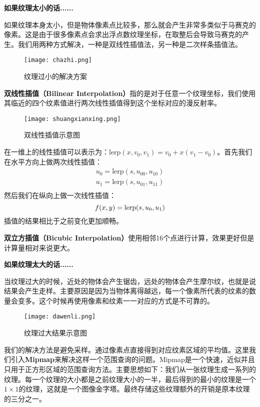 \documentclass[openany]{progbookcn}
\begin{document}
\textbf{如果纹理太小的话......}

如果纹理本身太小，但是物体像素点比较多，那么就会产生非常多类似于马赛克的像素。这是由于很多像素点会求出浮点数纹理坐标，在取整后会导致马赛克的产生。我们用两种方式解决，一种是双线性插值法，另一种是二次样条插值法。
\begin{figure}[H]
	\centering
	\texttt{[image: chazhi.png]}
	\caption{纹理过小的解决方案}
	\label{fig:chazhi}
\end{figure}

\textbf{双线性插值（Bilinear Interpolation）}指的是对于任意一个纹理坐标，我们使用其临近的四个纹素值进行两次线性插值得到这个坐标对应的漫反射率。

\begin{figure}[H]
	\centering
	\texttt{[image: shuangxianxing.png]}
	\caption{双线性插值示意图}
	\label{fig:shuangxianxing}
\end{figure}
在一维上的线性插值可以表示为：$\text{lerp}(x,v_0,v_1)=v_0+x(v_1-v_0)$。首先我们在水平方向上做两次线性插值：
\begin{equation}
	\begin{split}
		u_0 = \text{lerp}(s,u_{00},u_{10})\\
		u_1 = \text{lerp}(s,u_{01},u_{11})\\
	\end{split}
\end{equation}
然后我们在纵向上做一次线性插值：
\begin{equation}
		f(x,y) = \text{lerp}(s,u_{0},u_{1})\\
\end{equation}
插值的结果相比于之前变化更加顺畅。

\textbf{双立方插值（Bicubic Interpolation）}使用相邻16个点进行计算，效果更好但是计算量相对来说更大。

\textbf{如果纹理太大的话......}

当纹理过大的时候，近处的物体会产生锯齿，远处的物体会产生摩尔纹，也就是说结果会产生走样。主要原因是因为当物体离得越远，每一个像素所代表的纹素的数量会变多。这个时候再使用像素和纹素一一对应的方式是不可靠的。
\begin{figure}[H]
	\centering
	\texttt{[image: dawenli.png]}
	\caption{纹理过大结果示意图}
	\label{fig:dawenli}
\end{figure}
我们的解决方法是避免采样。通过像素点直接得到对应纹素区域的平均值。这里我们引入\textbf{Mipmap}来解决这样一个范围查询的问题。Mipmap是一个快速，近似并且只用于正方形区域的范围查询方法。主要思想如下：我们从一张纹理生成一系列的纹理。每一个纹理的大小都是之前纹理大小的一半，最后得到的最小的纹理是一个$1\times 1$的纹理，这就是一个图像金字塔。最终存储这些纹理额外的开销是原本纹理的三分之一。
\end{document}
